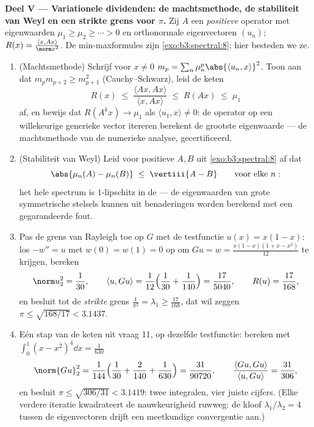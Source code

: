 \begin{problem}
\medskip
\noindent\textbf{Deel V --- Variationele dividenden: de
machtsmethode, de stabiliteit van Weyl en een strikte grens voor
$\pi$.} Zij $A$ een   \emph{positieve}
operator met eigenwaarden $\mu_1 \geq \mu_2 \geq \cdots > 0$ en
orthonormale eigenvectoren $(u_n)$; $R(x) = \frac{\langle x,
Ax\rangle}{\norm x^2}$. De min-maxformules zijn
\cref{exo:b3:spectral:8}; hier besteden we ze.
\begin{enumerate}[resume]
  \item (Machtsmethode) Schrijf voor $x \neq 0$ $m_p =
        \sum_n\mu_n^p\abs{\langle u_n, x\rangle}^2$. Toon aan dat
        $m_pm_{p+2} \geq m_{p+1}^2$ (Cauchy--Schwarz), leid de
        keten
        \[
        R(x) \;\leq\; \frac{\langle Ax, Ax\rangle}{\langle x,
        Ax\rangle} \;\leq\; R(Ax) \;\leq\; \mu_1
        \]
        af, en bewijs dat $R(A^kx) \to \mu_1$ als $\langle u_1,
        x\rangle \neq 0$: de operator op een willekeurige
        generieke vector itereren berekent de grootste eigenwaarde
        --- de machtsmethode van de numerieke analyse,
        gecertificeerd.
  \item (Stabiliteit van Weyl) Leid voor 
         positieve $A, B$ uit
        \cref{exo:b3:spectral:8} af dat
        \[
        \abs{\mu_n(A) - \mu_n(B)} \;\leq\; \vertiii{A - B}
        \qquad\text{voor elke } n :
        \]
        het hele spectrum is $1$-lipschitz in de  ---
        de eigenwaarden van grote symmetrische stelsels kunnen uit
        benaderingen worden berekend met een gegarandeerde fout.
  \item Pas de grens van Rayleigh toe op $G$ met de testfunctie
        $u(x) = x(1-x)$: los $-w'' = u$ met $w(0) = w(1) = 0$ op
        om $Gu = w = \frac{x(1-x)(1 + x - x^2)}{12}$ te krijgen,
        bereken
        \[
        \norm u_2^2 = \frac1{30}, \qquad
        \langle u, Gu\rangle = \frac1{12}\Bigl(\frac1{30} +
        \frac1{140}\Bigr) = \frac{17}{5040},
        \qquad R(u) = \frac{17}{168},
        \]
        en besluit tot de \emph{strikte} grens $\frac1{\pi^2} =
        \lambda_1 \geq \frac{17}{168}$, dat wil zeggen $\pi \leq
        \sqrt{168/17} < 3.1437$.
  \item Eén stap van de keten uit vraag 11, op dezelfde
        testfunctie: bereken met $\int_0^1(x - x^2)^4\dd x =
        \frac1{630}$
        \[
        \norm{Gu}_2^2 = \frac1{144}\Bigl(\frac1{30} +
        \frac2{140} + \frac1{630}\Bigr) = \frac{31}{90720},
        \qquad
        \frac{\langle Gu, Gu\rangle}{\langle u, Gu\rangle} =
        \frac{31}{306},
        \]
        en besluit $\pi \leq \sqrt{306/31} < 3.1419$: twee
        integralen, vier juiste cijfers. (Elke verdere iteratie
        kwadrateert de nauwkeurigheid ruwweg: de kloof
        $\lambda_1/\lambda_2 = 4$ tussen de eigenvectoren drijft
        een meetkundige convergentie aan.)
\end{enumerate}


\end{problem}
